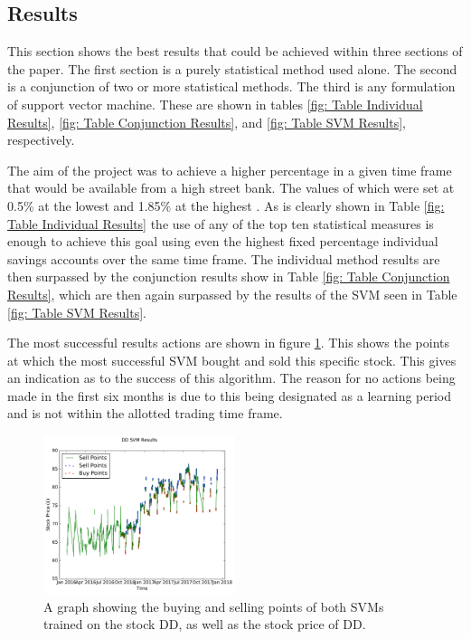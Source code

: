 \documentclass[conference]{IEEEtran}
\begin{document}
\subsection{Results}

This section shows the best results that could be achieved within three sections of the paper. The first section is a purely statistical method used alone. The second is a conjunction of two or more statistical methods. The third is any formulation of support vector machine. These are shown in tables \ref{fig: Table Individual Results}, \ref{fig: Table Conjunction Results}, and \ref{fig: Table SVM Results}, respectively.

The aim of the project was to achieve a higher percentage in a given time frame that would be available from a high street bank. The values of which were set at 0.5\% at the lowest \cite{BankofEngland2014} and 1.85\% at the highest \cite{Murray2018}. As is clearly shown in Table  \ref{fig: Table Individual Results} the use of any of the top ten statistical measures is enough to achieve this goal using even the highest fixed percentage individual savings accounts over the same time frame. The individual method results are then surpassed by the conjunction results show in Table \ref{fig: Table Conjunction Results}, which are then again surpassed by the results of the SVM seen in Table \ref{fig: Table SVM Results}.

The most successful results actions are shown in figure \ref{fig:SVMResults}. This shows the points at which the most successful SVM bought and sold this specific stock. This gives an indication as to the success of this algorithm. The reason for no actions being made in the first six months is due to this being designated as a learning period and is not within the allotted trading time frame.

\begin{figure}
\includegraphics[width=0.5\textwidth, angle=0]{SVMResults.pdf}
\caption{A graph showing the buying and selling points of both SVMs trained on the stock DD, as well as the stock price of DD.}
\label{fig:SVMResults}
\end{figure}
\end{document}
